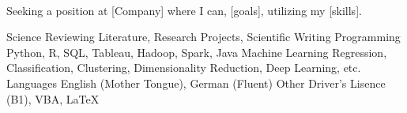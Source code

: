 

\\
  \begin{cvparagraph}
  Seeking a position at [Company] where I can, [goals], utilizing my [skills].
  \end{cvparagraph}

  \begin{cvskills}
    \cvskill
      {Science} %
      {Reviewing Literature, Research Projects, Scientific Writing} %
    \cvskill
      {Programming} %
      {Python, R, SQL, Tableau, Hadoop, Spark, Java} %
    \cvskill
      {Machine Learning} %
      {Regression, Classification, Clustering, Dimensionality Reduction, Deep Learning, etc.} %
    \cvskill
      {Languages} %
      {English (Mother Tongue), German (Fluent)} %
    \cvskill
      {Other} %
      {Driver's Lisence (B1), VBA, LaTeX} %

  \end{cvskills}
